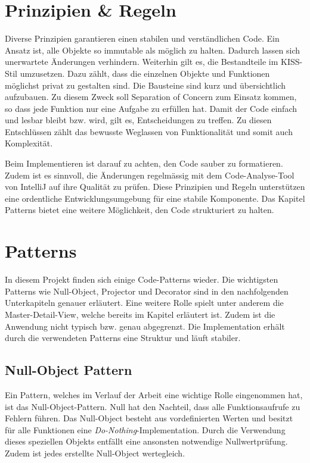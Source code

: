 \section{Prinzipien \& Regeln}
\label{sec:principleRules}

Diverse Prinzipien garantieren einen stabilen und verständlichen Code. 
Ein Ansatz ist, alle Objekte so immutable als möglich zu halten. 
Dadurch lassen sich unerwartete Änderungen verhindern. 
Weiterhin gilt es, die Bestandteile im KISS-Stil umzusetzen. 
Dazu zählt, dass die einzelnen Objekte und Funktionen möglichst privat zu gestalten sind. 
Die Bausteine sind kurz und übersichtlich aufzubauen. 
Zu diesem Zweck soll Separation of Concern zum Einsatz kommen, so dass jede Funktion nur eine Aufgabe zu erfüllen hat. 
Damit der Code einfach und lesbar bleibt bzw. wird, gilt es, Entscheidungen zu treffen. 
Zu diesen Entschlüssen zählt das bewusste Weglassen von Funktionalität und somit auch Komplexität. 

Beim Implementieren ist darauf zu achten, den Code sauber zu formatieren. 
Zudem ist es sinnvoll, die Änderungen regelmässig mit dem Code-Analyse-Tool von IntelliJ auf ihre Qualität zu prüfen. 
Diese Prinzipien und Regeln unterstützen eine ordentliche Entwicklungsumgebung für eine stabile Komponente. 
Das Kapitel Patterns bietet eine weitere Möglichkeit, den Code strukturiert zu halten. 


\section{Patterns}
\label{sec:patterns}

In diesem Projekt finden sich einige Code-Patterns wieder. 
Die wichtigsten Patterns wie Null-Object, Projector und Decorator sind in den nachfolgenden Unterkapiteln genauer erläutert.
Eine weitere Rolle spielt unter anderem die Master-Detail-View, welche bereits im Kapitel \textbf{} erläutert ist. 
Zudem ist die Anwendung nicht typisch bzw. genau abgegrenzt. 
Die Implementation erhält durch die verwendeten Patterns eine Struktur und läuft stabiler. 


\subsection{Null-Object Pattern}
\label{sec:nullPattern}

Ein Pattern, welches im Verlauf der Arbeit eine wichtige Rolle eingenommen hat, ist das Null-Object-Pattern. 
Null hat den Nachteil, dass alle Funktionsaufrufe zu Fehlern führen. 
Das Null-Object besteht aus vordefinierten Werten und besitzt für alle Funktionen eine \emph{Do-Nothing}-Implementation. 
Durch die Verwendung dieses speziellen Objekts entfällt eine ansonsten notwendige Nullwertprüfung. 
Zudem ist jedes erstellte Null-Object wertegleich. 

